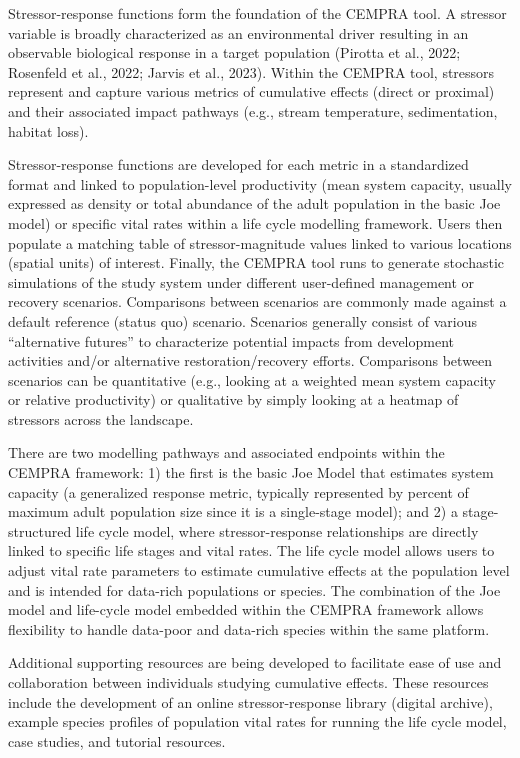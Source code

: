 \documentclass[
  letterpaper,
  DIV=11,
  numbers=noendperiod]{scrreprt}
\begin{document}
Stressor-response functions form the foundation of the CEMPRA tool. A
stressor variable is broadly characterized as an environmental driver
resulting in an observable biological response in a target population
(Pirotta et al., 2022; Rosenfeld et al., 2022; Jarvis et al., 2023).
Within the CEMPRA tool, stressors represent and capture various metrics
of cumulative effects (direct or proximal) and their associated impact
pathways (e.g., stream temperature, sedimentation, habitat loss).

Stressor-response functions are developed for each metric in a
standardized format and linked to population-level productivity (mean
system capacity, usually expressed as density or total abundance of the
adult population in the basic Joe model) or specific vital rates within
a life cycle modelling framework. Users then populate a matching table
of stressor-magnitude values linked to various locations (spatial units)
of interest. Finally, the CEMPRA tool runs to generate stochastic
simulations of the study system under different user-defined management
or recovery scenarios. Comparisons between scenarios are commonly made
against a default reference (status quo) scenario. Scenarios generally
consist of various ``alternative futures'' to characterize potential
impacts from development activities and/or alternative
restoration/recovery efforts. Comparisons between scenarios can be
quantitative (e.g., looking at a weighted mean system capacity or
relative productivity) or qualitative by simply looking at a heatmap of
stressors across the landscape.

There are two modelling pathways and associated endpoints within the
CEMPRA framework: 1) the first is the basic Joe Model that estimates
system capacity (a generalized response metric, typically represented by
percent of maximum adult population size since it is a single-stage
model); and 2) a stage-structured life cycle model, where
stressor-response relationships are directly linked to specific life
stages and vital rates. The life cycle model allows users to adjust
vital rate parameters to estimate cumulative effects at the population
level and is intended for data-rich populations or species. The
combination of the Joe model and life-cycle model embedded within the
CEMPRA framework allows flexibility to handle data-poor and data-rich
species within the same platform.

Additional supporting resources are being developed to facilitate ease
of use and collaboration between individuals studying cumulative
effects. These resources include the development of an online
stressor-response library (digital archive), example species profiles of
population vital rates for running the life cycle model, case studies,
and tutorial resources.
\end{document}
